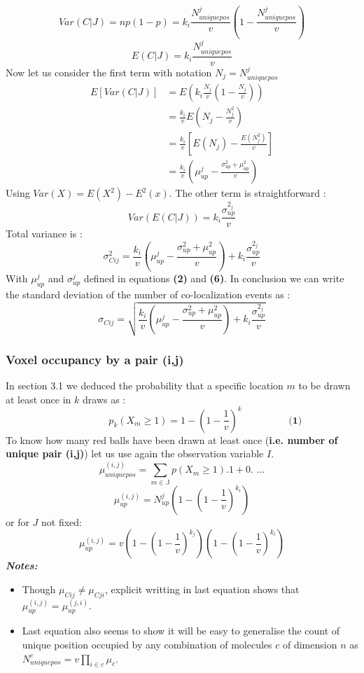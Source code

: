 \documentclass{article}
\begin{document}
\[
    Var(C|J) = np(1-p) = k_i \frac{N^j_{uniquepos}}{v}(1-\frac{N^j_{uniquepos}}{v})
\]
\[
    E(C|J) = k_i \frac{N^j_{uniquepos}}{v}
\]
Now let us consider the first term with notation $N_j = N^j_{uniquepos}$
\[
    \begin{split}
    E[Var(C|J)] &= E(k_i \frac{N_j}{v}(1-\frac{N_j}{v})) \\
    &= \frac{k_i}{v}E(N_j - \frac{N^2_j}{v}) \\
    &= \frac{k_i}{v}[E(N_j) - \frac{E(N^2_j)}{v}] \\
    &= \frac{k_i}{v}(\mu^j_{up} - \frac{\sigma^2_{up} + \mu^2_{up}}{v})
\end{split}
\]
Using $Var(X) = E(X^2) - E^2(x)$.\newline
The other term is straightforward : 
\[
Var(E(C|J)) = k_i\frac{\sigma^{2_j}_{up}}{v}
\]
Total variance is :
\[
    \sigma^2_{Cij} = \frac{k_i}{v}(\mu^j_{up} - \frac{\sigma^2_{up} + \mu^2_{up}}{v}) + k_i\frac{\sigma^{2_j}_{up}}{v}
\]
With $\mu^j_{up}$ and $\sigma^j_{up}$ defined in equations \textbf{(2)} and \textbf{(6)}.\newline
In conclusion we can write the standard deviation of the number of co-localization events as :
\begin{equation}
    \sigma_{Cij} = \sqrt{\frac{k_i}{v}(\mu^j_{up} - \frac{\sigma^2_{up} + \mu^2_{up}}{v}) + k_i\frac{\sigma^{2_j}_{up}}{v}}
\end{equation}




\subsubsection{Voxel occupancy by a pair (i,j)}
In section 3.1 we deduced the probability that a specific location $m$ to be drawn at least once  in $k$ draws as :
\[
    \hspace{2cm} p_k(X_m \geq 1) = 1-(1 - \frac{1}{v})^k \hspace{2cm} \textbf{(1)}
\]
To know how many red balls have been drawn at least once (\textbf{i.e. number of unique pair (i,j)}) let us use again the observation
variable $I$.
\[
\mu^{(i,j)}_{uniquepos} = \sum_{m \in \mathbb{J}}p(X_m \geq 1).1 + 0. \textbf{ ...}
\]
\begin{equation}
\mu^{(i,j)}_{up} = N^j_{up}(1-(1-\frac{1}{v})^{k_i})
\end{equation}
or for $J$ not fixed:
\[
\mu^{(i,j)}_{up} = v(1-(1-\frac{1}{v})^{k_j})(1-(1-\frac{1}{v})^{k_i})
\]
\textit{\textbf{Notes:}}
\begin{itemize}
    \item Though $\mu_{Cij} \neq \mu_{Cji}$, explicit writting in last equation shows that \newline 
    $\mu^{(i,j)}_{up} = \mu^{(j,i)}_{up}$.
    \item Last equation also seems to show it will be easy to generalise the count of unique position occupied by any combination of molecules $c$ of dimension $n$
    as $N^c_{uniquepos} = v\prod_{i \in c}\mu_c$.
\end{itemize}
\end{document}
